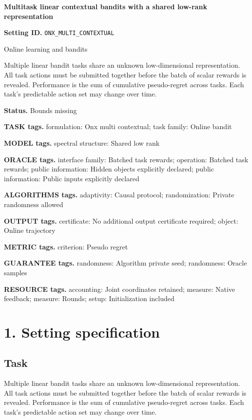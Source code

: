 \documentclass[10pt,a4paper]{article}
\begin{document}
\raggedright

{\LARGE\bfseries\sffamily\color{AtlasNavy} Multitask linear contextual bandits with a shared low-rank representation\par}\vspace{5pt}
\textbf{Setting ID.} \texttt{ONX\_\allowbreak{}MULTI\_\allowbreak{}CONTEXTUAL}

Online learning and bandits

Multiple linear bandit tasks share an unknown low-dimensional representation. All task actions must be submitted together before the batch of scalar rewards is revealed. Performance is the sum of cumulative pseudo-regret across tasks. Each task’s predictable action set may change over time.

\textbf{Status.} Bounds missing

\textbf{TASK tags.} formulation: Onx multi contextual; task family: Online bandit

\textbf{MODEL tags.} spectral structure: Shared low rank

\textbf{ORACLE tags.} interface family: Batched task rewards; operation: Batched task rewards; public information: Hidden objects explicitly declared; public information: Public inputs explicitly declared

\textbf{ALGORITHMS tags.} adaptivity: Causal protocol; randomization: Private randomness allowed

\textbf{OUTPUT tags.} certificate: No additional output certificate required; object: Online trajectory

\textbf{METRIC tags.} criterion: Pseudo regret

\textbf{GUARANTEE tags.} randomness: Algorithm private seed; randomness: Oracle samples

\textbf{RESOURCE tags.} accounting: Joint coordinates retained; measure: Native feedback; measure: Rounds; setup: Initialization included

\section{1. Setting specification}
\subsection{Task}
Multiple linear bandit tasks share an unknown low-dimensional representation. All task actions must be submitted together before the batch of scalar rewards is revealed. Performance is the sum of cumulative pseudo-regret across tasks. Each task’s predictable action set may change over time.
\end{document}

